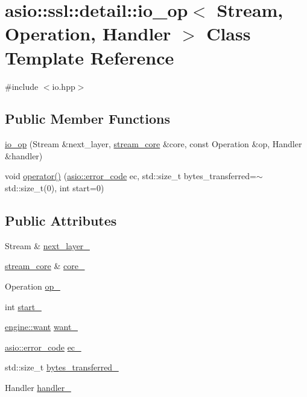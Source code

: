 \hypertarget{classasio_1_1ssl_1_1detail_1_1io__op}{}\section{asio\+:\+:ssl\+:\+:detail\+:\+:io\+\_\+op$<$ Stream, Operation, Handler $>$ Class Template Reference}
\label{classasio_1_1ssl_1_1detail_1_1io__op}


{\ttfamily \#include $<$io.\+hpp$>$}

\subsection*{Public Member Functions}
\begin{DoxyCompactItemize}
\item 
\hyperlink{classasio_1_1ssl_1_1detail_1_1io__op_a6265a418e64a89feeb031b0eec0c66f7}{io\+\_\+op} (Stream \&next\+\_\+layer, \hyperlink{structasio_1_1ssl_1_1detail_1_1stream__core}{stream\+\_\+core} \&core, const Operation \&op, Handler \&handler)
\item 
void \hyperlink{classasio_1_1ssl_1_1detail_1_1io__op_a23b5b98bcadd08853ff37bfcac72ea35}{operator()} (\hyperlink{classasio_1_1error__code}{asio\+::error\+\_\+code} ec, std\+::size\+\_\+t bytes\+\_\+transferred=$\sim$std\+::size\+\_\+t(0), int start=0)
\end{DoxyCompactItemize}
\subsection*{Public Attributes}
\begin{DoxyCompactItemize}
\item 
Stream \& \hyperlink{classasio_1_1ssl_1_1detail_1_1io__op_ac9a971480ecb8df84bedc0d891172c63}{next\+\_\+layer\+\_\+}
\item 
\hyperlink{structasio_1_1ssl_1_1detail_1_1stream__core}{stream\+\_\+core} \& \hyperlink{classasio_1_1ssl_1_1detail_1_1io__op_a8cfc4ec7786e88fb893239e3afa0d73a}{core\+\_\+}
\item 
Operation \hyperlink{classasio_1_1ssl_1_1detail_1_1io__op_aa3fa2b3e3ad0ee8aa4724a9f1dc9a307}{op\+\_\+}
\item 
int \hyperlink{classasio_1_1ssl_1_1detail_1_1io__op_a447be685fcda22c40259253c5c276543}{start\+\_\+}
\item 
\hyperlink{classasio_1_1ssl_1_1detail_1_1engine_ab9812153941a6a93c9095f4e5ca8f915}{engine\+::want} \hyperlink{classasio_1_1ssl_1_1detail_1_1io__op_a8046c9964a8fd25d82af1c7008c10aed}{want\+\_\+}
\item 
\hyperlink{classasio_1_1error__code}{asio\+::error\+\_\+code} \hyperlink{classasio_1_1ssl_1_1detail_1_1io__op_a3b6a192d0f0e5e3af719212a21f0d221}{ec\+\_\+}
\item 
std\+::size\+\_\+t \hyperlink{classasio_1_1ssl_1_1detail_1_1io__op_a6ae68a9ff5e4002202fcffa1feca8f46}{bytes\+\_\+transferred\+\_\+}
\item 
Handler \hyperlink{classasio_1_1ssl_1_1detail_1_1io__op_a554b84344ad9c6b4d15ac03cc296a2d9}{handler\+\_\+}
\end{DoxyCompactItemize}


